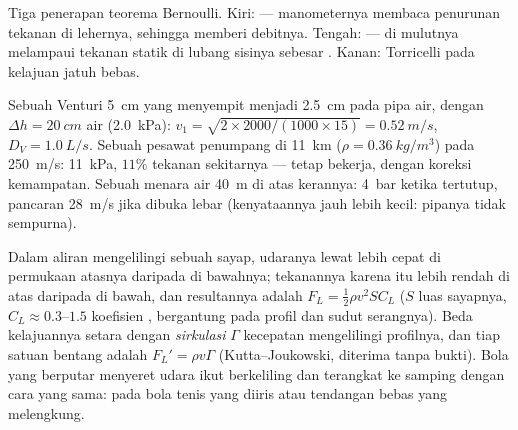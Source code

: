 \begin{omfigure}
{\small Tiga penerapan teorema Bernoulli. Kiri:  ---
manometernya membaca penurunan tekanan di lehernya, sehingga memberi
debitnya. Tengah:  ---  di mulutnya
melampaui tekanan statik di lubang sisinya sebesar . Kanan:  Torricelli pada kelajuan jatuh bebas.}
\end{omfigure}

\begin{example}[Angka]\label{ex:b2:euler-bernoulli:numbers}
Sebuah Venturi \qty{5}{cm} yang menyempit menjadi \qty{2.5}{cm} pada pipa air, dengan
$\Delta h = \qty{20}{cm}$ air (\qty{2.0}{kPa}): $v_1 = \sqrt{2 \times 2000/
(1000 \times 15)} = \qty{0.52}{m/s}$, $D_V = \qty{1.0}{L/s}$. Sebuah pesawat penumpang di
\qty{11}{km} ($\rho = \qty{0.36}{kg/m^3}$) pada \qty{250}{m/s}: 
\qty{11}{kPa}, $11\%$ tekanan sekitarnya ---  tetap
bekerja, dengan koreksi kemampatan. Sebuah menara air \qty{40}{m}
di atas kerannya: \qty{4}{bar} ketika tertutup, pancaran \qty{28}{m/s} jika dibuka
lebar (kenyataannya jauh lebih kecil: pipanya tidak sempurna).
\end{example}

\begin{proposition}\label{prop:b2:euler-bernoulli:lift}
Dalam aliran mengelilingi sebuah sayap, udaranya lewat lebih cepat di
permukaan atasnya daripada di bawahnya; tekanannya karena itu lebih
rendah di atas daripada di bawah, dan resultannya adalah \emph{} $F_L =
\tfrac12\rho v^2SC_L$ ($S$ luas sayapnya, $C_L \approx 0.3$--$1.5$ koefisien
, bergantung pada profil dan sudut serangnya). Beda
kelajuannya setara dengan \emph{sirkulasi} $\Gamma$ kecepatan
mengelilingi profilnya, dan  tiap satuan bentang adalah $F_L' =
\rho v\Gamma$ (Kutta--Joukowski, diterima tanpa bukti). Bola yang berputar
menyeret udara ikut berkeliling dan terangkat ke samping dengan cara yang
sama: \emph{} pada bola tenis yang diiris atau tendangan bebas
yang melengkung.
\end{proposition}

